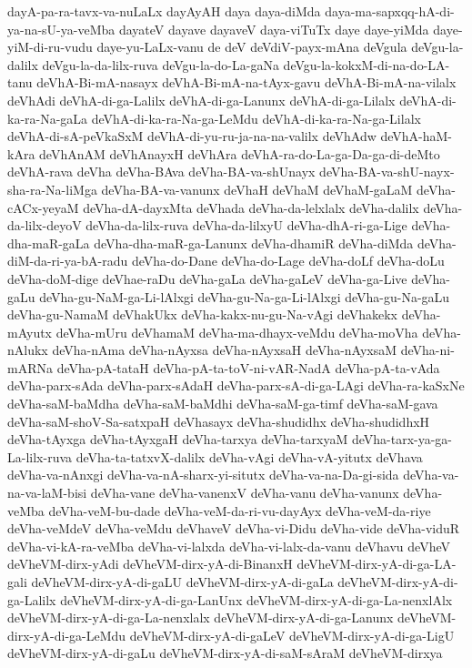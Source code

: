 {dayA-pa-ra-tavx-va-nuLaLx
dayAyAH
daya
daya-diMda
daya-ma-sapxqq-hA-di-ya-na-sU-ya-veMba
dayateV
dayave
dayaveV
daya-viTuTx
daye
daye-yiMda
daye-yiM-di-ru-vudu
daye-yu-LaLx-vanu
de
deV
deVdiV-payx-mAna
deVgula
deVgu-la-dalilx
deVgu-la-da-lilx-ruva
deVgu-la-do-La-gaNa
deVgu-la-kokxM-di-na-do-LA-tanu
deVhA-Bi-mA-nasayx
deVhA-Bi-mA-na-tAyx-gavu
deVhA-Bi-mA-na-vilalx
deVhAdi
deVhA-di-ga-Lalilx
deVhA-di-ga-Lanunx
deVhA-di-ga-Lilalx
deVhA-di-ka-ra-Na-gaLa
deVhA-di-ka-ra-Na-ga-LeMdu
deVhA-di-ka-ra-Na-ga-Lilalx
deVhA-di-sA-peVkaSxM
deVhA-di-yu-ru-ja-na-na-valilx
deVhAdw
deVhA-haM-kAra
deVhAnAM
deVhAnayxH
deVhAra
deVhA-ra-do-La-ga-Da-ga-di-deMto
deVhA-rava
deVha
deVha-BAva
deVha-BA-va-shUnayx
deVha-BA-va-shU-nayx-sha-ra-Na-liMga
deVha-BA-va-vanunx
deVhaH
deVhaM
deVhaM-gaLaM
deVha-cACx-yeyaM
deVha-dA-dayxMta
deVhada
deVha-da-lelxlalx
deVha-dalilx
deVha-da-lilx-deyoV
deVha-da-lilx-ruva
deVha-da-lilxyU
deVha-dhA-ri-ga-Lige
deVha-dha-maR-gaLa
deVha-dha-maR-ga-Lanunx
deVha-dhamiR
deVha-diMda
deVha-diM-da-ri-ya-bA-radu
deVha-do-Dane
deVha-do-Lage
deVha-doLf
deVha-doLu
deVha-doM-dige
deVhae-raDu
deVha-gaLa
deVha-gaLeV
deVha-ga-Live
deVha-gaLu
deVha-gu-NaM-ga-Li-lAlxgi
deVha-gu-Na-ga-Li-lAlxgi
deVha-gu-Na-gaLu
deVha-gu-NamaM
deVhakUkx
deVha-kakx-nu-gu-Na-vAgi
deVhakekx
deVha-mAyutx
deVha-mUru
deVhamaM
deVha-ma-dhayx-veMdu
deVha-moVha
deVha-nAlukx
deVha-nAma
deVha-nAyxsa
deVha-nAyxsaH
deVha-nAyxsaM
deVha-ni-mARNa
deVha-pA-tataH
deVha-pA-ta-toV-ni-vAR-NadA
deVha-pA-ta-vAda
deVha-parx-sAda
deVha-parx-sAdaH
deVha-parx-sA-di-ga-LAgi
deVha-ra-kaSxNe
deVha-saM-baMdha
deVha-saM-baMdhi
deVha-saM-ga-timf
deVha-saM-gava
deVha-saM-shoV-Sa-satxpaH
deVhasayx
deVha-shudidhx
deVha-shudidhxH
deVha-tAyxga
deVha-tAyxgaH
deVha-tarxya
deVha-tarxyaM
deVha-tarx-ya-ga-La-lilx-ruva
deVha-ta-tatxvX-dalilx
deVha-vAgi
deVha-vA-yitutx
deVhava
deVha-va-nAnxgi
deVha-va-nA-sharx-yi-situtx
deVha-va-na-Da-gi-sida
deVha-va-na-va-laM-bisi
deVha-vane
deVha-vanenxV
deVha-vanu
deVha-vanunx
deVha-veMba
deVha-veM-bu-dade
deVha-veM-da-ri-vu-dayAyx
deVha-veM-da-riye
deVha-veMdeV
deVha-veMdu
deVhaveV
deVha-vi-Didu
deVha-vide
deVha-viduR
deVha-vi-kA-ra-veMba
deVha-vi-lalxda
deVha-vi-lalx-da-vanu
deVhavu
deVheV
deVheVM-dirx-yAdi
deVheVM-dirx-yA-di-BinanxH
deVheVM-dirx-yA-di-ga-LA-gali
deVheVM-dirx-yA-di-gaLU
deVheVM-dirx-yA-di-gaLa
deVheVM-dirx-yA-di-ga-Lalilx
deVheVM-dirx-yA-di-ga-LanUnx
deVheVM-dirx-yA-di-ga-La-nenxlAlx
deVheVM-dirx-yA-di-ga-La-nenxlalx
deVheVM-dirx-yA-di-ga-Lanunx
deVheVM-dirx-yA-di-ga-LeMdu
deVheVM-dirx-yA-di-gaLeV
deVheVM-dirx-yA-di-ga-LigU
deVheVM-dirx-yA-di-gaLu
deVheVM-dirx-yA-di-saM-sAraM
deVheVM-dirxya
}
